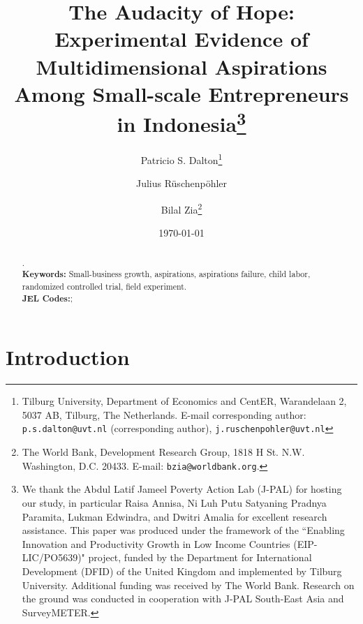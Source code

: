 \documentclass[11.5pt]{article}
\begin{document}
\title{\Large \textbf{The Audacity of Hope: \\Experimental Evidence of Multidimensional Aspirations Among Small-scale Entrepreneurs in Indonesia}\thanks {\scriptsize We thank the Abdul Latif Jameel Poverty Action Lab (J-PAL) for hosting our study, in particular Raisa Annisa, Ni Luh Putu Satyaning Pradnya Paramita, Lukman Edwindra, and Dwitri Amalia for excellent research assistance. This paper was produced under the framework of the \textquotedblleft Enabling Innovation and Productivity Growth in Low Income Countries (EIP-LIC/PO5639)" project, funded by the Department for International Development (DFID) of the United Kingdom and implemented by Tilburg University. Additional funding was received by The World Bank. Research on the ground was conducted in cooperation with J-PAL South-East Asia and SurveyMETER.}}

\author{Patricio S. Dalton\thanks{\scriptsize Tilburg University, Department of Economics and CentER, Warandelaan 2, 5037 AB, Tilburg, The Netherlands. E-mail corresponding author: \texttt{p.s.dalton@uvt.nl} (corresponding author), \texttt{j.ruschenpohler@uvt.nl}}
\and Julius R\"uschenp\"ohler\footnotemark[2]
\and Bilal Zia\thanks{\scriptsize The World Bank, Development Research Group, 1818 H St. N.W. Washington, D.C. 20433. E-mail: \texttt{bzia@worldbank.org}.}}


\date{\today}
\maketitle
\singlespace

\begin{abstract}
\noindent {}.\\

\noindent\textbf{Keywords:} Small-business growth, aspirations, aspirations failure, child labor, randomized controlled trial, field experiment.\\
\noindent\textbf{JEL Codes:};
\end{abstract}
\vfill

\thispagestyle{empty}

\pagebreak

\onehalfspacing

\setcounter{page}{1}


\section{\textbf{Introduction}}
\end{document}
